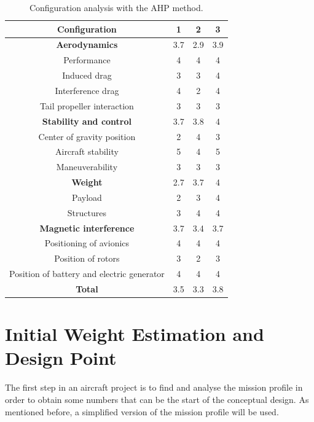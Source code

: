\documentclass[english,fira]{ist-report}
\begin{document}
\begin{table}[ht]
	\centering
	\begin{tabular}{c|C C C}\toprule
		\textbf{Configuration}			& 1		& 2		& 3			\\
		\midrule
		\textbf{Aerodynamics}			& 3.7	& 2.9	& 3.9		\\
		\midrule
		Performance						& 4		& 4		& 4			\\
		Induced drag					& 3		& 3		& 4			\\
		Interference drag				& 4		& 2		& 4			\\
		Tail propeller interaction		& 3		& 3		& 3			\\
		\midrule
		\textbf{Stability and control}	& 3.7	& 3.8	& 4			\\
		\midrule
		Center of gravity position		& 2		& 4		& 3			\\
		Aircraft stability				& 5		& 4		& 5			\\
		Maneuverability					& 3		& 3		& 3			\\
		\midrule
		\textbf{Weight}					& 2.7	& 3.7	& 4			\\
		\midrule
		Payload							& 2		& 3		& 4			\\
		Structures						& 3		& 4		& 4			\\
		\midrule
		\textbf{Magnetic interference}	& 3.7	& 3.4	& 3.7		\\
		\midrule
		Positioning of avionics			& 4		& 4		& 4			\\
		Position of rotors				& 3		& 2		& 3			\\ 
		Position of battery and electric generator	& 4	& 4	& 4		\\
		\midrule
		\textbf{Total}					& 3.5	& 3.3	& 3.8		\\
		\bottomrule
	\end{tabular}
	\caption{Configuration analysis with the AHP method.}
	\label{tab:ahp_evaluations}
\end{table}

\chapter{Initial Weight Estimation and Design Point} \label{chap:designpoint}

The first step in an aircraft project is to find and analyse the mission profile in order to obtain some numbers that can be the start of the conceptual design. As mentioned before, a simplified version of the mission profile will be used. 
\end{document}
